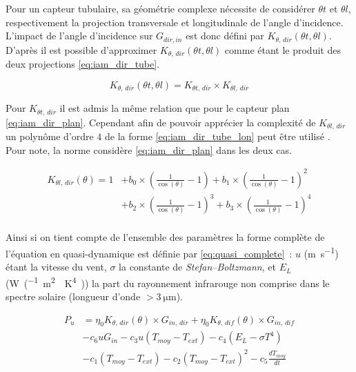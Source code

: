 Pour un capteur tubulaire, sa géométrie complexe nécessite de considérer $\theta t$ et
$\theta l$, respectivement la projection transversale et longitudinale de l’angle
d’incidence. L’impact de l’angle d’incidence sur $G_{dir, in}$ est donc défini par
$K_{\theta,\,dir} (\theta t, \theta l)$. D’après \textcite{McIntire1982315} il est possible
d’approximer $K_{\theta,\,dir} (\theta t, \theta l)$ comme étant le produit des deux
projections \eqref{eq:iam_dir_tube}.

\begin{equation}\label{eq:iam_dir_tube}
    K_{\theta,\,dir} (\theta t, \theta l) = K_{\theta t,\,dir} \times K_{\theta l,\,dir}
\end{equation}

Pour $K_{\theta t,\,dir}$ il est admis la même relation que pour le capteur plan \eqref{eq:iam_dir_plan}.
Cependant afin de pouvoir apprécier la complexité de $K_{\theta l,\,dir}$ un polynôme d’ordre
$4$ de la forme \eqref{eq:iam_dir_tube_lon} peut être utilisé \parencite{Zambolin201237}.
Pour note, la norme considère \eqref{eq:iam_dir_plan} dans les deux cas.

\begin{align}\label{eq:iam_dir_tube_lon}
    K_{\theta l,\,dir} (\theta) = 1 &+ b_{0} \times \left(\frac{1}{\cos(\theta)} - 1\right)
                          + b_{1} \times \left(\frac{1}{\cos(\theta)} - 1\right)^{2} \\
                          &+ b_{2} \times \left(\frac{1}{\cos(\theta)} - 1\right)^{3}
                          + b_{3} \times \left(\frac{1}{\cos(\theta)} - 1\right)^{4} \\
\end{align}

Ainsi si on tient compte de l’ensemble des paramètres la forme complète de l’équation
en quasi-dynamique est définie par \eqref{eq:quasi_complete}~: $u$ (\si{\metre\per\second})
étant la vitesse du vent, $\sigma$ la constante de \textit{Stefan–Boltzmann}, et $E_{L}$
(\si{W\per(\metre\squared\period\kelvin^{4})}) la part du rayonnement infrarouge
non comprise dans le spectre solaire (longueur d’onde $> \SI{3}{\micro\metre}$).


\begin{align}\label{eq:quasi_complete}
        P_{u}  &= \eta_{0} K_{\theta,\,dir}(\theta) \times G_{in,\,dir} +
                  \eta_{0} K_{\theta,\,dif}(\theta) \times G_{in,\,dif} \\
                &- c_{6}uG_{in} - c_{3} u(T_{moy} - T_{ext}) - c_{4} (E_{L} - \sigma T^{4}) \\
                &- c_{1} (T_{moy} - T_{ext}) - c_{2} (T_{moy} - T_{ext})^{2} - c_{5}\frac{dT_{moy}}{dt}
\end{align}


